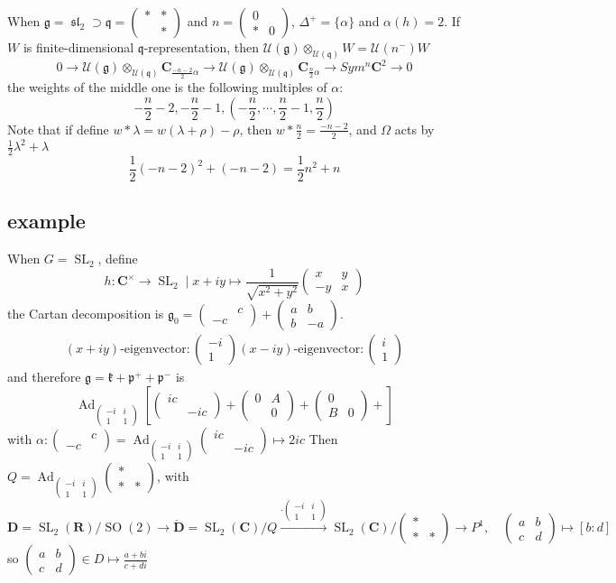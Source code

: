 \documentclass[leqno]{amsart}
\newcommand{\smat}[1]{\left( \begin{smallmatrix} #1 \end{smallmatrix} \right)}
\DeclareMathOperator{\SL}{SL}
\DeclareMathOperator{\SO}{SO}
\DeclareMathOperator{\sll}{\mathfrak{sl}}
\DeclareMathOperator{\Ad}{Ad}
\newcommand{\R}{\mathbf R}
\newcommand{\C}{\mathbf C}
\newcommand{\DD}{\mathbf{D}}
\newcommand{\DDD}{\check{\mathbf{D}}}
\newcommand{\1}{\mathbf{1}}
\newcommand{\rfg}{\mathfrak{g}_0}
\newcommand{\cfg}{\mathfrak{g}}
\newcommand{\cfk}{\mathfrak{k}}
\newcommand{\cfp}{\mathfrak{p}}
\newcommand{\cfq}{\mathfrak{q}}
\theoremstyle{definition}
\theoremstyle{remark}
\begin{document}
When $\cfg=\sll_2\supset \cfq=\smat{*&*\\&*}$ 
and $n=\smat{0&\\*&0}$,
$\Delta^+=\{\alpha\}$ and $\alpha(h)=2$.
If  $W$ is finite-dimensional  $\cfq$-representation,
then  $\mathcal{U}(\cfg)\otimes_{\mathcal{U}(\cfq)}W=\mathcal{U}(n^-)W$
\[
	0\to
	\mathcal{U}(\cfg)
	\otimes_{ \mathcal{U}(\cfq)}
	\C_{\frac{-n-2}{2}\alpha}\to
	\mathcal{U}(\cfg)
	\otimes_{ \mathcal{U}(\cfq)}
	\C_{\frac{n}{2}\alpha}\to
	Sym^n\C^2\to0
\]
the weights of the middle one is
the following multiples of $\alpha$:
 \[
	-\frac{n}{2}-2,
	-\frac{n}{2}-1,
	(-\frac{n}{2},\cdots,
	\frac{n}{2}-1,
	\frac{n}{2})
\]
Note that 
if define 
$w*\lambda=w(\lambda+\rho)-\rho$,
then  $w*\frac{n}{2}=\frac{-n-2}{2}$,
and $\Omega$ acts by
 $\frac{1}{2}\lambda^2+\lambda$
 \[
	 \frac{1}{2}(-n-2)^2+(-n-2)=
	 \frac{1}{2}n^2+n
 \]

\subsection{example}

When $G=\SL_2$, define
 \[
	h\colon \C^\times\to \SL_2\mid
	x+iy\mapsto
	\frac{1}{\sqrt{x^2+y^2}}
	\smat{x&y\\-y&x}
\]
the Cartan decomposition is 
$\rfg=\smat{&c\\-c&}+\smat{a&b\\b&-a}$.
\begin{gather*}
	(x+iy)\text{-eigenvector}\colon
	\smat{-i\\1}
	(x-iy)\text{-eigenvector}\colon
	\smat{i\\1}
\end{gather*}
and therefore $\cfg=\cfk+\cfp^++\cfp^-$ is
\[
	\Ad_{\smat{-i&i\\1&1}}
	\left[
	\smat{ic&\\&-ic}+
	\smat{0&A\\&0}+
	\smat{0&\\B&0}+
	\right]
\]
with $\alpha\colon \smat{&c\\-c&}=
	\Ad_{\smat{-i&i\\1&1}}\smat{ic&\\&-ic}
	\mapsto 2ic $ 
	Then  $Q=\Ad_{\smat{-i&i\\1&1}}\smat{*&\\*&*}$, with
\[
	\DD=
	\SL_2(\R)/\SO(2)\to
	\DDD=\SL_2(\C)/Q
	\xrightarrow{\cdot\smat{-i&i\\1&1}}
	\SL_2(\C)/\smat{*&\\*&*}\to
	P^1,\quad
	\smat{a&b\\c&d}\mapsto [b:d]
\]
	so $\smat{a&b\\c&d}\in D\mapsto 
	\frac{a+bi}{c+di}$
\end{document}
